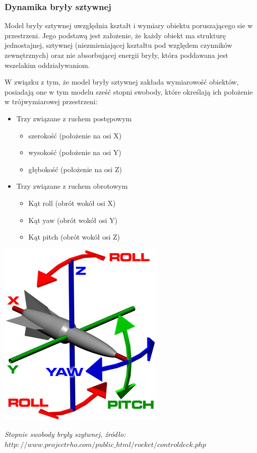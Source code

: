 \subsubsection{Dynamika bryły sztywnej}
\par{
Model bryły sztywnej uwzględnia kształt i wymiary obiektu poruszającego sie w przestrzeni. Jego podstawą jest założenie, że każdy obiekt ma strukturę jednostajnej, sztywnej (niezmieniającej kształtu pod względem czynników zewnętrznych) oraz nie absorbującej energii bryły, która poddawana jest wszelakim oddziaływaniom.
}
\par{
W związku z tym, że model bryły sztywnej zakłada wymiarowość obiektów, posiadają one w tym modelu sześć stopni swobody, które określają ich położenie w trójwymiarowej przestrzeni:
\begin{itemize}
\item Trzy związane z ruchem postępowym
	\begin{itemize}
	\item szerokość (położenie na osi X)
	\item wysokość (położenie na osi Y)
	\item głębokość (położenie na osi Z)
	\end{itemize}
\item Trzy związane z ruchem obrotowym
	\begin{itemize}
	\item Kąt roll (obrót wokół osi X)
	\item Kąt yaw (obrót wokół osi Y)
	\item Kąt pitch (obrót wokół osi Z)
	\end{itemize}
\end{itemize}
}
\par{
\begin{center}
\includegraphics[]{img/xyz_ryp}
\end{center}
}
\par{
\begin{center}
\textit{Stopnie swobody bryły szytwnej, źródło: $http://www.projectrho.com/public\_html/rocket/controldeck.php$}
\end{center}
}
